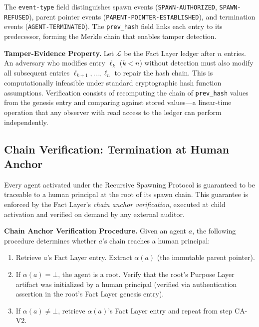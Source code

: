 The \texttt{event-type} field distinguishes spawn events (\texttt{SPAWN-AUTHORIZED}, \texttt{SPAWN-REFUSED}), parent pointer events (\texttt{PARENT-POINTER-ESTABLISHED}), and termination events (\texttt{AGENT-TERMINATED}). The \texttt{prev\_hash} field links each entry to its predecessor, forming the Merkle chain that enables tamper detection.

\medskip
\noindent\textbf{Tamper-Evidence Property.} Let $\mathcal{L}$ be the Fact Layer ledger after $n$ entries. An adversary who modifies entry $\ell_k$ ($k < n$) without detection must also modify all subsequent entries $\ell_{k+1}, \ldots, \ell_n$ to repair the hash chain. This is computationally infeasible under standard cryptographic hash function assumptions. Verification consists of recomputing the chain of \texttt{prev\_hash} values from the genesis entry and comparing against stored values---a linear-time operation that any observer with read access to the ledger can perform independently.

\subsection{Chain Verification: Termination at Human Anchor}

Every agent activated under the Recursive Spawning Protocol is guaranteed to be traceable to a human principal at the root of its spawn chain. This guarantee is enforced by the Fact Layer's \emph{chain anchor verification}, executed at child activation and verified on demand by any external auditor.

\medskip
\noindent\textbf{Chain Anchor Verification Procedure.} Given an agent $a$, the following procedure determines whether $a$'s chain reaches a human principal:

\begin{enumerate}
  \item[(CA-V1)] Retrieve $a$'s Fact Layer entry. Extract $\alpha(a)$ (the immutable parent pointer).
  \item[(CA-V2)] If $\alpha(a) = \bot$, the agent is a root. Verify that the root's Purpose Layer artifact was initialized by a human principal (verified via authentication assertion in the root's Fact Layer genesis entry).
  \item[(CA-V3)] If $\alpha(a) \neq \bot$, retrieve $\alpha(a)$'s Fact Layer entry and repeat from step CA-V2.
\end{enumerate}


